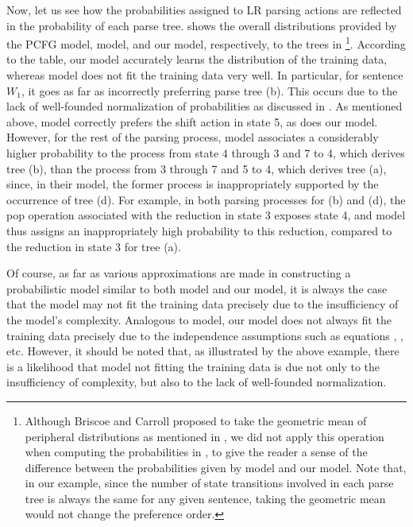 \documentclass[a4j]{article}
\def\BC{}
\def\sec#1{}
\def\fig#1{}
\def\tbl#1{}
\def\eq#1{}
\begin{document}
Now, let us see how the probabilities assigned to LR parsing actions are
reflected in the probability of each parse tree. \tbl{result3} shows the
overall distributions provided by the PCFG model, \BC model, and our
model, respectively, to the trees in \fig{trees3}\footnote{Although
Briscoe and Carroll proposed to take the geometric mean of peripheral
distributions as mentioned in \sec{BC-model}, we did not apply this
operation when computing the probabilities in \tbl{result3}, to give the
reader a sense of the difference between the probabilities given by \BC
model and our model. Note that, in our example, since the number of
state transitions involved in each parse tree is always the same for any
given sentence, taking the geometric mean would not change the
preference order.}.
According to the table, our model accurately learns the distribution of
the training data, whereas \BC model does not fit the training data very
well. In particular, for sentence $W_1$, it goes as far as incorrectly
preferring parse tree (b). This occurs due to the lack of well-founded
normalization of probabilities as discussed in \sec{BC-model}. As
mentioned above, \BC model correctly prefers the shift action in state
5, as does our model.  However, for the rest of the parsing process, \BC
model associates a considerably higher probability to the process from
state 4 through 3 and 7 to 4, which derives tree (b), than the process
from 3 through 7 and 5 to 4, which derives tree (a), since, in their
model, the former process is inappropriately supported by the occurrence
of tree (d). For example, in both parsing processes for (b) and (d), the
pop operation associated with the reduction in state 3 exposes state 4,
and \BC model thus assigns an inappropriately high probability to this
reduction, compared to the reduction in state 3 for tree (a).

Of course, as far as various approximations are made in constructing a
probabilistic model similar to both \BC model and our model, it is
always the case that the model may not fit the training data precisely
due to the insufficiency of the model's complexity. Analogous to \BC
model, our model does not always fit the training data precisely due to
the independence assumptions such as equations \eq{st-supset}, \eq{l1},
etc. However, it should be noted that, as illustrated by the above
example, there is a likelihood that \BC model not fitting the training
data is due not only to the insufficiency of complexity, but also to the
lack of well-founded normalization.
\end{document}
